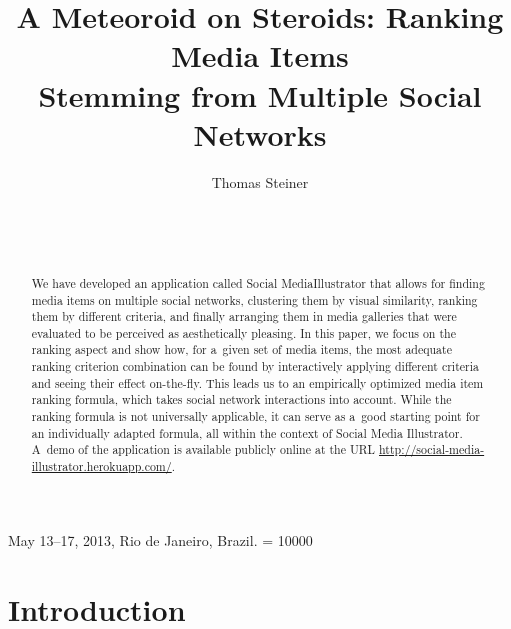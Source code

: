 \documentclass{sig-alt-release2}
\newcommand{\inlinelistingsize}{\fontsize{8pt}{11pt}}
\let\oldurl\url
\renewcommand{\url}[1]{\inlinelistingsize\oldurl{#1}}
\begin{document}
 {May 13--17, 2013, Rio de Janeiro, Brazil.} 
\widowpenalty = 10000

\title{A Meteoroid on Steroids: Ranking Media Items\\ Stemming from Multiple Social Networks}

\author{
\alignauthor
Thomas Steiner\\
	\\
	\\
	\\
}
\maketitle

\begin{abstract}
We have developed an application called Social Media\linebreak Illustrator
that allows for finding media items on multiple social networks,
clustering them by visual similarity, ranking them by different criteria,
and finally arranging them in media galleries
that were evaluated to be perceived as aesthetically pleasing.
In this paper, we focus on the ranking aspect and show how,
for a~given set of media items, the most adequate ranking criterion combination
can be found by interactively applying different criteria
and seeing their effect on-the-fly.
This leads us to an empirically optimized media item ranking formula,
which takes social network interactions into account.
While the ranking formula is not universally applicable,
it can serve as a~good starting point for an individually adapted formula,
all within the context of Social Media Illustrator.
A~demo of the application is available publicly online at the URL
\url{http://social-media-illustrator.herokuapp.com/}.
\end{abstract}

\vspace{-1mm}

\vspace{-2mm}

\vspace{-2mm}

\section{Introduction}
\end{document}
